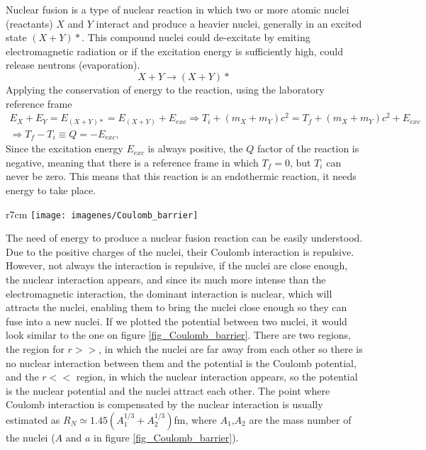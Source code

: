 \documentclass[a4paper,12pt,oneside]{book}
\begin{document}
Nuclear fusion is a type of nuclear reaction in which two or more atomic nuclei (reactants) $X$ and $Y$ interact and produce a heavier nuclei, generally in an excited state $(X+Y)*$. This compound nuclei could de-excitate by emiting electromagnetic radiation or if the excitation energy is sufficiently high, could release neutrons (evaporation).
%
\begin{equation}
X+Y \rightarrow (X+Y)*
\end{equation}
%
Applying the conservation of energy to the reaction, using the laboratory reference frame
%
\begin{equation}
	\left.
	\begin{array}{c}
E_X+E_Y=E_{(X+Y)*}=E_{(X+Y)}+E_{exc} \Rightarrow T_i+(m_X+m_Y)c^2=T_f+(m_X+m_Y)c^2 +E_{exc} \\ 
\Rightarrow T_f-T_i \equiv Q =-E_{exc},
\end{array}
\right.
\end{equation}
Since the excitation energy $E_{exc}$ is always positive, the $Q$ factor of the reaction is negative, meaning that there is a reference frame in which $T_f=0$, but $T_i$ can never be zero. This means that this reaction is an endothermic reaction, it needs energy to take place.

%
\begin{wrapfigure}{r}{7cm}
\centering
\texttt{[image: imagenes/Coulomb\_barrier]}
\caption{Coulomb barrier between two nuclei of mass number $A$ and $a$. $e=e/(4 \pi \varepsilon_0)$. Source: \cite{Satchler}.}
\label{fig_Coulomb_barrier}
\end{wrapfigure} 
%
The need of energy to produce a nuclear fusion reaction can be easily understood. Due to the positive charges of the nuclei, their Coulomb interaction is repulsive. However, not always the interaction is repulsive, if the nuclei are close enough, the nuclear interaction appears, and since its much more intense than the electromagnetic interaction, the dominant interaction is nuclear, which will attracts the nuclei, enabling them to bring the nuclei close enough so they can fuse into a new nuclei. If we plotted the potential between two nuclei, it would look similar to the one on figure \ref{fig_Coulomb_barrier}. There are two regions, the region for $r>>$, in which the nuclei are far away from each other so there is no nuclear interaction between them and the potential is the Coulomb potential, and the $r<<$ region, in which the nuclear interaction appears, so the potential is the nuclear potential and the nuclei attract each other. The point where Coulomb interaction is compensated by the nuclear interaction is usually estimated as $R_N \simeq 1.45 (A_1^{1/3}+A_2^{1/3})$fm, where $A_1$,$A_2$ are the mass number of the nuclei ($A$ and $a$ in figure \ref{fig_Coulomb_barrier}).
\end{document}
